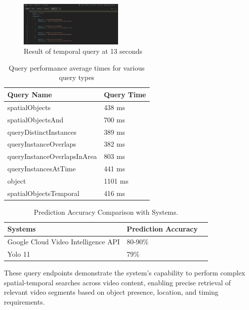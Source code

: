 \documentclass[conference]{IEEEtran}
\begin{document}
\begin{figure}[H]
    \centering
    \includegraphics[width=0.45\textwidth]{11.jpeg}
    \caption{Result of temporal query at 13 seconds}
    \label{fig:query11}
\end{figure}
\begin{table}[h!]
    \centering
    \begin{tabular}{|l|l|}
        \hline
        \textbf{Query Name} & \textbf{Query Time} \\ \hline
        spatialObjects & 438 ms \\ \hline
        spatialObjectsAnd & 700 ms \\ \hline
        queryDistinctInstances & 389 ms \\ \hline
        queryInstanceOverlaps & 382 ms \\ \hline
        queryInstanceOverlapsInArea & 803 ms \\ \hline
        queryInstancesAtTime & 441 ms \\ \hline
        object & 1101 ms \\ \hline
        spatialObjectsTemporal & 416 ms \\ \hline
    \end{tabular}
    \caption{Query performance average times for various query types}
    \label{tab:query_times}
\end{table}
\begin{table}[h!]
    \centering
    \begin{tabular}{|l|l|l|}
        \hline
        \textbf{Systems} & \textbf{Prediction Accuracy} \\ \hline
        Google Cloud Video Intelligence API & 80-90\% \\ \hline
        Yolo 11 & 79\% \\ \hline
    \end{tabular}
    \caption{Prediction Accuracy Comparison with Systems.}
    \label{tab:prediction_accuracy}
\end{table}
These query endpoints demonstrate the system's capability to perform complex spatial-temporal searches across video content, enabling precise retrieval of relevant video segments based on object presence, location, and timing requirements.
\end{document}
